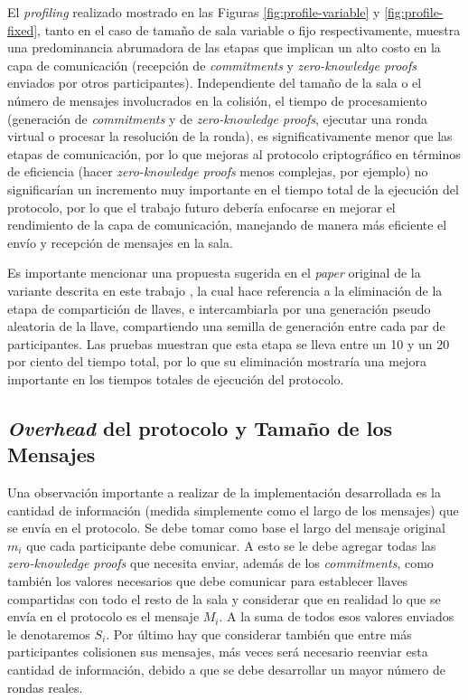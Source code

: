 El \emph{profiling} realizado mostrado en las Figuras 
\ref{fig:profile-variable} y \ref{fig:profile-fixed}, tanto en el caso de 
tamaño de sala variable o fijo respectivamente, muestra una 
predominancia abrumadora de las etapas que implican un alto costo en la 
capa de comunicación (recepción de \emph{commitments} y 
\emph{zero-knowledge proofs} enviados por otros participantes). 
Independiente del tamaño de la sala o el número de mensajes involucrados 
en la colisión, el tiempo de procesamiento (generación de 
\emph{commitments} y de \emph{zero-knowledge proofs}, ejecutar una ronda 
virtual o procesar la resolución de la ronda), es significativamente menor 
que las etapas de comunicación, por lo que mejoras al protocolo 
criptográfico en términos de eficiencia (hacer \emph{zero-knowledge proofs}
menos complejas, por ejemplo) no significarían un incremento muy 
importante en el tiempo total de la ejecución del protocolo, por lo que el 
trabajo futuro debería enfocarse en mejorar el rendimiento de la capa de 
comunicación, manejando de manera más eficiente el envío y recepción de 
mensajes en la sala.

Es importante mencionar una propuesta sugerida en 
el \emph{paper} original de la variante descrita en este trabajo 
\cite{franck2014dining}, la cual hace referencia a la eliminación de la etapa 
de compartición de llaves, e intercambiarla por una generación pseudo 
aleatoria de la llave, compartiendo una semilla de generación entre cada 
par de participantes. Las pruebas muestran que esta etapa se lleva entre 
un 10 y un 20 por ciento del tiempo total, por lo que su eliminación 
mostraría una mejora importante en los tiempos totales de ejecución del 
protocolo.

\subsection{\emph{Overhead} del protocolo y Tamaño de los Mensajes}

Una observación importante a realizar de la implementación desarrollada es la 
cantidad de información (medida simplemente como el largo de los mensajes) que 
se envía en el protocolo. Se debe tomar como base el largo del mensaje 
original $m_i$ que cada participante debe comunicar. A esto se le debe agregar 
todas las \emph{zero-knowledge proofs} que necesita enviar, además de los 
\emph{commitments}, como también los valores necesarios que debe comunicar para establecer 
llaves compartidas con todo el resto de la sala y considerar que en realidad 
lo que se envía en el protocolo es el mensaje $M_i$. A la suma de todos esos 
valores enviados le denotaremos $S_i$. Por último hay que considerar también 
que entre más participantes colisionen sus mensajes, más veces será necesario 
reenviar esta cantidad de información, debido a que se debe desarrollar un 
mayor número de rondas reales.

